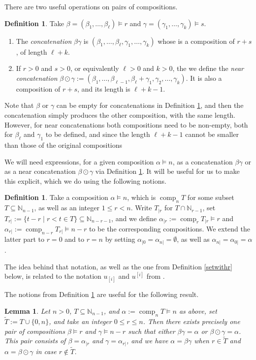 \documentclass{article}
\newtheorem{lem}[thm]{Lemma}
\theoremstyle{definition}
\newtheorem{defn}[thm]{Definition}
\begin{document}
\medskip

There are two useful operations on pairs of compositions.
\begin{defn}
Take $\beta=(\beta_{1},\ldots,\beta_{\ell}) \vDash r$ and $\gamma=(\gamma_{1},\ldots,\gamma_{k}) \vDash s$.
\begin{enumerate}[$(i)$]
\item The \emph{concatenation} $\beta\gamma$ is $(\beta_{1},\ldots,\beta_{\ell},\gamma_{1},\ldots,\gamma_{k})$ whose is a composition of $r+s$, of length $\ell+k$.
\item If $r>0$ and $s>0$, or equivalently $\ell>0$ and $k>0$, the we define the \emph{near concatenation} $\beta\odot\gamma:=(\beta_{1},\ldots,\beta_{\ell-1},\beta_{\ell}+\gamma_{1},\gamma_{2},\ldots,\gamma_{k})$. It is also a composition of $r+s$, and its length is $\ell+k-1$.
\end{enumerate} \label{defconc}
\end{defn}
Note that $\beta$ or $\gamma$ can be empty for concatenations in Definition \ref{defconc}, and then the concatenation simply produces the other composition, with the same length. However, for near concatenations both compositions need to be non-empty, both for $\beta_{\ell}$ and $\gamma_{1}$ to be defined, and since the length $\ell+k-1$ cannot be smaller than those of the original compositions

We will need expressions, for a given composition $\alpha \vDash n$, as a concatenation $\beta\gamma$ or as a near concatenation $\beta\odot\gamma$ via Definition \ref{defconc}. It will be useful for us to make this explicit, which we do using the following notions.
\begin{defn}
Take a composition $\alpha \vDash n$, which is $\operatorname{comp}_{n}T$ for some subset $T\subseteq\mathbb{N}_{n-1}$, as well as an integer $1 \leq r<n$. Write $T_{|r}$ for $T\cap\mathbb{N}_{r-1}$, set $T_{r|}:=\{t-r\;|\;r<t \in T\}\subseteq\mathbb{N}_{n-r-1}$, and we define $\alpha_{|r}:=\operatorname{comp}_{r}T_{|r} \vDash r$ and $\alpha_{r|}:=\operatorname{comp}_{n-r}T_{r|} \vDash n-r$ to be the corresponding compositions. We extend the latter part to $r=0$ and to $r=n$ by setting $\alpha_{|0}=\alpha_{n|}=\emptyset$, as well as $\alpha_{n|}=\alpha_{0|}=\alpha$. \label{cutatr}
\end{defn}
The idea behind that notation, as well as the one from Definition \ref{setwithr} below, is related to the notation $u_{[i]}$ and $u^{[i]}$ from \cite{[LM]}.

The notions from Definition \ref{cutatr} are useful for the following result.
\begin{lem}
Let $n>0$, $T\subseteq\mathbb{N}_{n-1}$, and $\alpha:=\operatorname{comp}_{n}T \vDash n$ as above, set $\tilde{T}:=T\cup\{0,n\}$, and take an integer $0 \leq r \leq n$. Then there exists precisely one pair of compositions $\beta \vDash r$ and $\gamma \vDash n-r$ such that either $\beta\gamma=\alpha$ or $\beta\odot\gamma=\alpha$. This pair consists of $\beta=\alpha_{|r}$ and $\gamma=\alpha_{r|}$, and we have $\alpha=\beta\gamma$ when $r\in\tilde{T}$ and $\alpha=\beta\odot\gamma$ in case $r\not\in\tilde{T}$. \label{concexp}
\end{lem}
\end{document}
